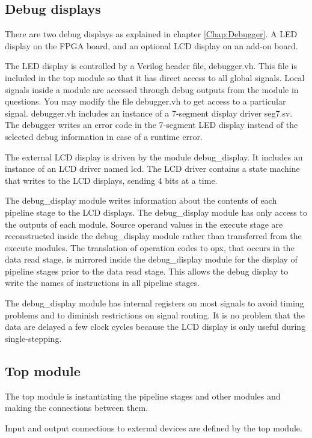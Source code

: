 \documentclass[11pt,a4paper,oneside,openright]{report}
\newcommand{\vv}{ \vspace{2mm} }   %
\begin{document}
\subsection{Debug displays}
There are two debug displays as explained in chapter \ref{Chap:Debugger}. A LED display on the FPGA board, and an optional LCD display on an add-on board.
\vv

The LED display is controlled by a Verilog header file, debugger.vh. This file is included in the top module so that it has direct access to all global signals. Local signals inside a module are accessed through debug outputs from the module in questions. You may modify the file debugger.vh to get access to a particular signal. debugger.vh includes an instance of a 7-segment display driver seg7.sv. The debugger writes an error code in the 7-segment LED display instead of the selected debug information in case of a runtime error.
\vv

The external LCD display is driven by the module debug\_display. 
It includes an instance of an LCD driver named lcd. 
The LCD driver contains a state machine that writes to the LCD displays, sending 4 bits at a time.
\vv

The debug\_display module writes information about the contents of each pipeline stage to the LCD displays. The debug\_display module has only access to the outputs of each module. Source operand values in the execute stage are reconstructed inside the debug\_display module rather than transferred from the execute modules. The translation of operation codes to opx, that occurs in the data read stage, is mirrored inside the debug\_display module for the display of pipeline stages prior to the data read stage. This allows the debug display to write the names of instructions in all pipeline stages.
\vv

The debug\_display module has internal registers on most signals to avoid timing problems and to diminish restrictions on signal routing. It is no problem that the data are delayed a few clock cycles because the LCD display is only useful during single-stepping.
\vv


\subsection{Top module}
The top module is instantiating the pipeline stages and other modules and making the connections between them.
\vv

Input and output connections to external devices are defined by the top module.
\vv
\end{document}
